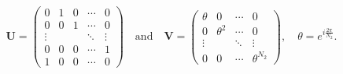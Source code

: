 \begin{equation}
\mathbf{U} = 
\left( 
\begin{array}{ccccc}  
0 & 1 & 0 & \cdots & 0  \\
0 & 0 & 1 & \cdots & 0  \\ 
\vdots & & & \ddots  & \vdots \\
0 & 0 & 0 & \cdots   & 1  \\
1 & 0 & 0 & \cdots   & 0
\end{array}
\right)
\quad \textrm{and} \quad 
\mathbf{V} = 
\left( 
\begin{array}{cccc}  
\theta & 0      &  \cdots & 0  \\
0      & \theta^2 &  \cdots & 0  \\ 
\vdots &        & \ddots  & \vdots   \\
0      & 0      & \cdots  & \theta^{N_2}  
\end{array}
\right),
\quad \theta = e^{i\frac{2 \pi }{N_2}}.
\end{equation}

